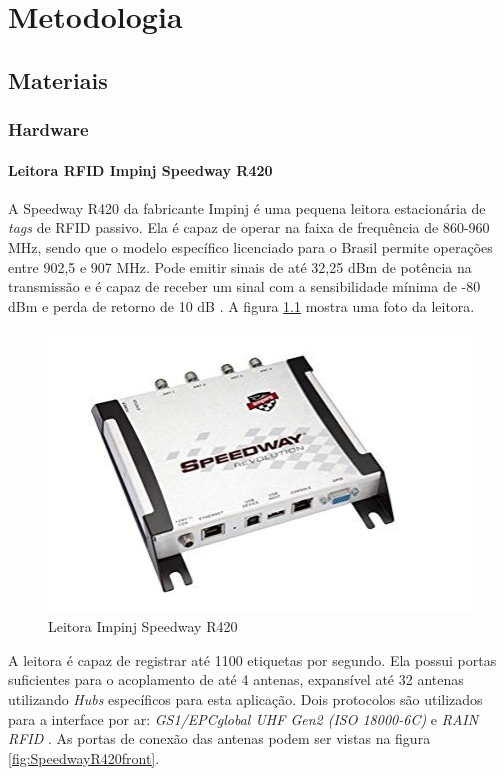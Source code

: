 
\chapter{Metodologia\label{chap:Metodos}}



\section{Materiais}
\subsection{Hardware}
\subsubsection{Leitora RFID Impinj Speedway R420}

A Speedway R420 da fabricante Impinj é uma pequena leitora estacionária de \textit{tags} de RFID passivo. Ela é capaz de operar na faixa de frequência de 860-960 MHz, sendo que o modelo específico licenciado para o Brasil permite operações entre 902,5 e 907 MHz. Pode emitir sinais de até 32,25 dBm de potência na transmissão e é capaz de receber um sinal com a sensibilidade mínima de -80 dBm e perda de retorno de 10 dB \cite{SpeedwayRDatasheet} \cite{SpeedwayRUserManual} \cite{TG2013OliveiraERocha}. A figura \ref{fig:SpeedwayR420_first} mostra uma foto da leitora.

    \begin{figure}[H]
        \centering
        \includegraphics[width=0.55\linewidth]{figs/Metodologia/leitoraSpeedwayR420.jpg}
        \caption{Leitora Impinj Speedway R420 \cite{SpeedwayRUserManual}}
        \label{fig:SpeedwayR420_first}
    \end{figure}

 A leitora é capaz de registrar até 1100 etiquetas por segundo. Ela possui portas suficientes para o acoplamento de até 4 antenas, expansível até 32 antenas utilizando \textit{Hubs} específicos para esta aplicação. Dois protocolos são utilizados para a interface por ar: \textit{GS1/EPCglobal UHF Gen2 (ISO 18000-6C)} e \textit{RAIN RFID} \cite{SpeedwayRDatasheet}\cite{SpeedwayRUserManual}. As portas de conexão das antenas podem ser vistas na figura \ref{fig:SpeedwayR420front}.
 
